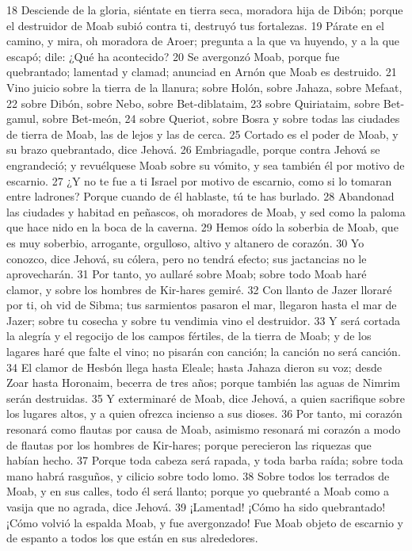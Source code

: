 18 Desciende de la gloria, siéntate en tierra seca, moradora hija de Dibón; porque el destruidor de Moab subió contra ti, destruyó tus fortalezas.
19 Párate en el camino, y mira, oh moradora de Aroer; pregunta a la que va huyendo, y a la que escapó; dile: ¿Qué ha acontecido?
20 Se avergonzó Moab, porque fue quebrantado; lamentad y clamad; anunciad en Arnón que Moab es destruido.
21 Vino juicio sobre la tierra de la llanura; sobre Holón, sobre Jahaza, sobre Mefaat,
22 sobre Dibón, sobre Nebo, sobre Bet-diblataim,
23 sobre Quiriataim, sobre Bet-gamul, sobre Bet-meón,
24 sobre Queriot, sobre Bosra y sobre todas las ciudades de tierra de Moab, las de lejos y las de cerca.
25 Cortado es el poder de Moab, y su brazo quebrantado, dice Jehová.
26 Embriagadle, porque contra Jehová se engrandeció; y revuélquese Moab sobre su vómito, y sea también él por motivo de escarnio.
27 ¿Y no te fue a ti Israel por motivo de escarnio, como si lo tomaran entre ladrones? Porque cuando de él hablaste, tú te has burlado.
28 Abandonad las ciudades y habitad en peñascos, oh moradores de Moab, y sed como la paloma que hace nido en la boca de la caverna.
29 Hemos oído la soberbia de Moab, que es muy soberbio, arrogante, orgulloso, altivo y altanero de corazón.
30 Yo conozco, dice Jehová, su cólera, pero no tendrá efecto; sus jactancias no le aprovecharán.
31 Por tanto, yo aullaré sobre Moab; sobre todo Moab haré clamor, y sobre los hombres de Kir-hares gemiré.
32 Con llanto de Jazer lloraré por ti, oh vid de Sibma; tus sarmientos pasaron el mar, llegaron hasta el mar de Jazer; sobre tu cosecha y sobre tu vendimia vino el destruidor.
33 Y será cortada la alegría y el regocijo de los campos fértiles, de la tierra de Moab; y de los lagares haré que falte el vino; no pisarán con canción; la canción no será canción.
34 El clamor de Hesbón llega hasta Eleale; hasta Jahaza dieron su voz; desde Zoar hasta Horonaim, becerra de tres años; porque también las aguas de Nimrim serán destruidas.
35 Y exterminaré de Moab, dice Jehová, a quien sacrifique sobre los lugares altos, y a quien ofrezca incienso a sus dioses.
36 Por tanto, mi corazón resonará como flautas por causa de Moab, asimismo resonará mi corazón a modo de flautas por los hombres de Kir-hares; porque perecieron las riquezas que habían hecho.
37 Porque toda cabeza será rapada, y toda barba raída; sobre toda mano habrá rasguños, y cilicio sobre todo lomo.
38 Sobre todos los terrados de Moab, y en sus calles, todo él será llanto; porque yo quebranté a Moab como a vasija que no agrada, dice Jehová.
39 ¡Lamentad! ¡Cómo ha sido quebrantado! ¡Cómo volvió la espalda Moab, y fue avergonzado! Fue Moab objeto de escarnio y de espanto a todos los que están en sus alrededores.

